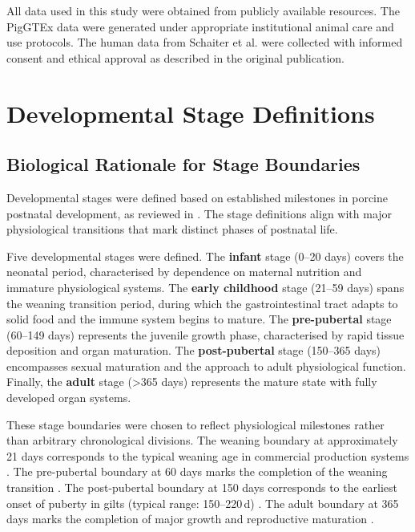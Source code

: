 All data used in this study were obtained from publicly available resources. The PigGTEx data were generated under appropriate institutional animal care and use protocols. The human data from Schaiter et al. were collected with informed consent and ethical approval as described in the original publication.


\section{Developmental Stage Definitions}\label{sec:methods:stages}

\subsection{Biological Rationale for Stage Boundaries}

Developmental stages were defined based on established milestones in porcine postnatal development, as reviewed in  \parencite{swindle_swine_2012}. The stage definitions align with major physiological transitions that mark distinct phases of postnatal life.

Five developmental stages were defined. The \textbf{infant} stage (0--20 days) covers the neonatal period, characterised by dependence on maternal nutrition and immature physiological systems. The \textbf{early childhood} stage (21--59 days) spans the weaning transition period, during which the gastrointestinal tract adapts to solid food \parencite{inoue_weaning_2015} and the immune system begins to mature. The \textbf{pre-pubertal} stage (60--149 days) represents the juvenile growth phase, characterised by rapid tissue deposition and organ maturation. The \textbf{post-pubertal} stage (150--365 days) encompasses sexual maturation and the approach to adult physiological function. Finally, the \textbf{adult} stage (>365 days) represents the mature state with fully developed organ systems.

These stage boundaries were chosen to reflect physiological milestones rather than arbitrary chronological divisions. The weaning boundary at approximately 21 days corresponds to the typical weaning age in commercial production systems \parencite{pluske_gastrointestinal_2018}. The pre-pubertal boundary at 60 days marks the completion of the weaning transition \parencite{whittemore_whittemores_2006}. The post-pubertal boundary at 150 days corresponds to the earliest onset of puberty in gilts (typical range: 150--220\,d) \parencite{lents_physiological_2020}. The adult boundary at 365 days marks the completion of major growth and reproductive maturation \parencite{whittemore_whittemores_2006}.

